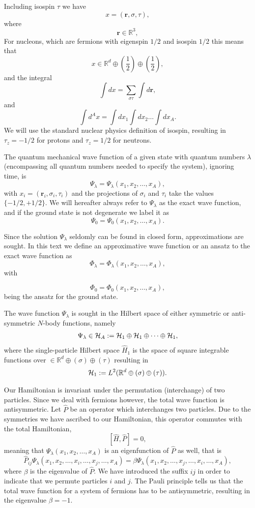 \documentclass[%
oneside,                 %
final,                   %
10pt]{article}
\begin{document}
Including isospin $\tau$ we have 
\[
x=(\bm{r},\sigma,\tau), 
\]
where 
\[
\bm{r}\in {\mathbb{R}}^{3},
\]
For nucleons, which are fermions with eigenspin $1/2$ and isospin $1/2$ this means that
\[
 x\in {\mathbb{R}}^{d}\oplus (\frac{1}{2})\oplus (\frac{1}{2}),
\]
and the integral
\[
\int dx = \sum_{\sigma\tau}\int d\bm{r},
\]
and
\[
\int d^Ax= \int dx_1\int dx_2\dots\int dx_A.
\]
We will use the standard nuclear physics definition of isospin, resulting in $\tau_z=-1/2$ for protons and $\tau_z=1/2$ for neutrons.



The quantum mechanical wave function of a given state with quantum numbers $\lambda$ (encompassing all quantum numbers needed to specify the system), ignoring time, is
\[
\Psi_{\lambda}=\Psi_{\lambda}(x_1,x_2,\dots,x_A),
\]
with $x_i=(\bm{r}_i,\sigma_i,\tau_i)$ and the projections of $\sigma_i$ and $\tau_i$ take the values
$\{-1/2,+1/2\}$. 
We will hereafter always refer to $\Psi_{\lambda}$ as the exact wave function, and if the ground state is not degenerate we label it as 
\[
\Psi_0=\Psi_0(x_1,x_2,\dots,x_A).
\]


Since the solution $\Psi_{\lambda}$ seldomly can be found in closed form, approximations are sought. In this text we define an approximative wave function or an ansatz to the exact wave function as 
\[
\Phi_{\lambda}=\Phi_{\lambda}(x_1,x_2,\dots,x_A),
\]
with

\[
\Phi_{0}=\Phi_{0}(x_{1},x_{2},\dots,x_{A}),
\]
being the ansatz for the ground state.  


The wave function $\Psi_{\lambda}$ is sought in the Hilbert space of either symmetric or anti-symmetric $N$-body functions, namely
\[
\Psi_{\lambda}\in {\cal H}_A:= {\cal H}_1\oplus{\cal H}_1\oplus\dots\oplus{\cal H}_1,
\]
where the single-particle Hilbert space $\hat{H}_1$ is the space of square integrable functions over $\in {\mathbb{R}}^{d}\oplus (\sigma)\oplus (\tau)$ resulting in
\[
{\cal H}_1:= L^2(\mathbb{R}^{d}\oplus (\sigma)\oplus (\tau)).
\]


Our Hamiltonian is invariant under the permutation (interchange) of two particles.
Since we deal with fermions however, the total wave function is antisymmetric.
Let $\hat{P}$ be an operator which interchanges two particles.
Due to the symmetries we have ascribed to our Hamiltonian, this operator commutes with the total Hamiltonian,
\[
[\hat{H},\hat{P}] = 0,
\]
meaning that $\Psi_{\lambda}(x_1, x_2, \dots , x_A)$ is an eigenfunction of 
$\hat{P}$ as well, that is
\[
\hat{P}_{ij}\Psi_{\lambda}(x_1, x_2, \dots,x_i,\dots,x_j,\dots,x_A)=
\beta\Psi_{\lambda}(x_1, x_2, \dots,x_j,\dots,x_i,\dots,x_A),
\]
where $\beta$ is the eigenvalue of $\hat{P}$. We have introduced the suffix $ij$ in order to indicate that we permute particles $i$ and $j$.
The Pauli principle tells us that the total wave function for a system of fermions
has to be antisymmetric, resulting in the eigenvalue $\beta = -1$.   
\end{document}
